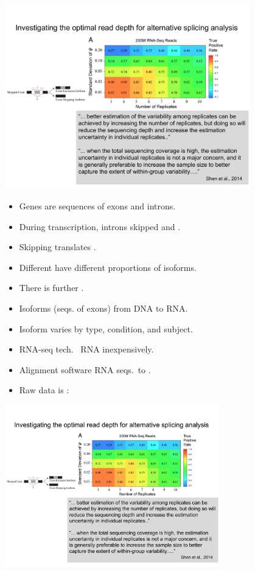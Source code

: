 \documentclass[10pt]{report}
\begin{document}
\begin{center}
\includegraphics[width=0.8\textwidth]{img/cassette-exon.pdf}
\end{center}
\begin{itemize}
\item Genes are sequences of exons and introns.
\item During transcription, introns skipped and .
\item Skipping  translates .
\item Different  have different proportions of isoforms.
\item There is further .
\end{itemize}

\begin{itemize}
\item Isoforms (seqs. of exons)  from DNA to RNA.
\item Isoform  varies by type, condition, and subject.
\item RNA-seq tech.\  RNA inexpensively.
\item Alignment software  RNA seqs.\ to .
\item Raw data is :
\end{itemize}
\begin{center}
\includegraphics[width=0.7\textwidth]{img/cassette-exon.pdf}
\end{center}
\end{document}
